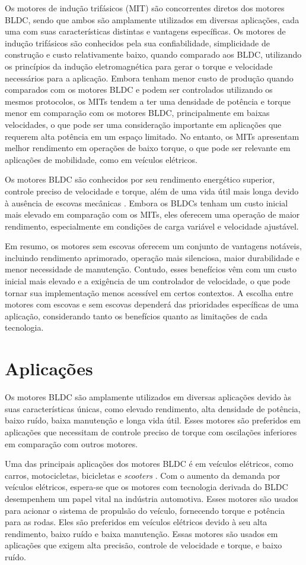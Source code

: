  Os motores de indução trifásicos (MIT) são concorrentes diretos dos motores BLDC, sendo que ambos são amplamente utilizados em diversas aplicações, cada uma com suas características distintas e vantagens específicas. Os motores de indução trifásicos são conhecidos pela sua confiabilidade, simplicidade de construção e custo relativamente baixo, quando comparado aos BLDC, utilizando os princípios da indução eletromagnética para gerar o torque e velocidade necessários para a aplicação. Embora tenham menor custo de produção quando comparados com os motores BLDC e podem ser controlados utilizando os mesmos protocolos, os MITs tendem a ter uma densidade de potência e torque menor em comparação com os motores BLDC, principalmente em baixas velocidades, o que pode ser uma consideração importante em aplicações que requerem alta potência em um espaço limitado. No entanto, os MITs apresentam melhor rendimento em operações de baixo torque, o que pode ser relevante em aplicações de mobilidade, como em veículos elétricos. 

 Os motores BLDC são conhecidos por seu rendimento energético superior, controle preciso de velocidade e torque, além de uma vida útil mais longa devido à ausência de escovas mecânicas \cite{gieras2009permanent}. Embora os BLDCs tenham um custo inicial mais elevado em comparação com os MITs, eles oferecem uma operação de maior rendimento, especialmente em condições de carga variável e velocidade ajustável. 

 Em resumo, os motores sem escovas oferecem um conjunto de vantagens notáveis, incluindo rendimento aprimorado, operação mais silenciosa, maior durabilidade e menor necessidade de manutenção. Contudo, esses benefícios vêm com um custo inicial mais elevado e a exigência de um controlador de velocidade, o que pode tornar sua implementação menos acessível em certos contextos. A escolha entre motores com escovas e sem escovas dependerá das prioridades específicas de uma aplicação, considerando tanto os benefícios quanto as limitações de cada tecnologia. 

 \section{Aplicações} 
 Os motores BLDC são amplamente utilizados em diversas aplicações devido às suas características únicas, como elevado rendimento, alta densidade de potência, baixo ruído, baixa manutenção e longa vida útil. Esses motores são preferidos em aplicações que necessitam de controle preciso de torque com oscilações inferiores em comparação com outros motores. 

 Uma das principais aplicações dos motores BLDC é em veículos elétricos, como carros, motocicletas, bicicletas e \textit{scooters} \cite{chau2007emerging}. Com o aumento da demanda por veículos elétricos, espera-se que os motores com tecnologia derivada do BLDC desempenhem um papel vital na indústria automotiva. Esses motores são usados para acionar o sistema de propulsão do veículo, fornecendo torque e potência para as rodas. Eles são preferidos em veículos elétricos devido à seu alta rendimento, baixo ruído e baixa manutenção. Essas motores são usados em aplicações que exigem alta precisão, controle de velocidade e torque, e baixo ruído.

